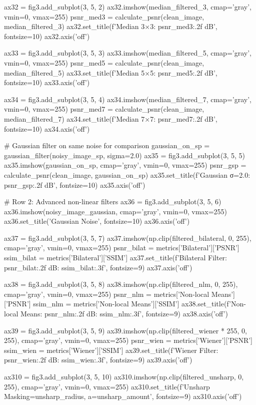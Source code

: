 \documentclass[a4paper, 11pt]{article}
\begin{document}
\begin{pycode}
ax32 = fig3.add_subplot(3, 5, 2)
ax32.imshow(median_filtered_3, cmap='gray', vmin=0, vmax=255)
psnr_med3 = calculate_psnr(clean_image, median_filtered_3)
ax32.set_title(f'Median 3×3\nPSNR: {psnr_med3:.2f} dB', fontsize=10)
ax32.axis('off')

ax33 = fig3.add_subplot(3, 5, 3)
ax33.imshow(median_filtered_5, cmap='gray', vmin=0, vmax=255)
psnr_med5 = calculate_psnr(clean_image, median_filtered_5)
ax33.set_title(f'Median 5×5\nPSNR: {psnr_med5:.2f} dB', fontsize=10)
ax33.axis('off')

ax34 = fig3.add_subplot(3, 5, 4)
ax34.imshow(median_filtered_7, cmap='gray', vmin=0, vmax=255)
psnr_med7 = calculate_psnr(clean_image, median_filtered_7)
ax34.set_title(f'Median 7×7\nPSNR: {psnr_med7:.2f} dB', fontsize=10)
ax34.axis('off')

# Gaussian filter on same noise for comparison
gaussian_on_sp = gaussian_filter(noisy_image_sp, sigma=2.0)
ax35 = fig3.add_subplot(3, 5, 5)
ax35.imshow(gaussian_on_sp, cmap='gray', vmin=0, vmax=255)
psnr_gsp = calculate_psnr(clean_image, gaussian_on_sp)
ax35.set_title(f'Gaussian σ=2.0\nPSNR: {psnr_gsp:.2f} dB', fontsize=10)
ax35.axis('off')

# Row 2: Advanced non-linear filters
ax36 = fig3.add_subplot(3, 5, 6)
ax36.imshow(noisy_image_gaussian, cmap='gray', vmin=0, vmax=255)
ax36.set_title('Gaussian Noise', fontsize=10)
ax36.axis('off')

ax37 = fig3.add_subplot(3, 5, 7)
ax37.imshow(np.clip(filtered_bilateral, 0, 255), cmap='gray', vmin=0, vmax=255)
psnr_bilat = metrics['Bilateral']['PSNR']
ssim_bilat = metrics['Bilateral']['SSIM']
ax37.set_title(f'Bilateral Filter\nPSNR: {psnr_bilat:.2f} dB\nSSIM: {ssim_bilat:.3f}', fontsize=9)
ax37.axis('off')

ax38 = fig3.add_subplot(3, 5, 8)
ax38.imshow(np.clip(filtered_nlm, 0, 255), cmap='gray', vmin=0, vmax=255)
psnr_nlm = metrics['Non-local Means']['PSNR']
ssim_nlm = metrics['Non-local Means']['SSIM']
ax38.set_title(f'Non-local Means\nPSNR: {psnr_nlm:.2f} dB\nSSIM: {ssim_nlm:.3f}', fontsize=9)
ax38.axis('off')

ax39 = fig3.add_subplot(3, 5, 9)
ax39.imshow(np.clip(filtered_wiener * 255, 0, 255), cmap='gray', vmin=0, vmax=255)
psnr_wien = metrics['Wiener']['PSNR']
ssim_wien = metrics['Wiener']['SSIM']
ax39.set_title(f'Wiener Filter\nPSNR: {psnr_wien:.2f} dB\nSSIM: {ssim_wien:.3f}', fontsize=9)
ax39.axis('off')

ax310 = fig3.add_subplot(3, 5, 10)
ax310.imshow(np.clip(filtered_unsharp, 0, 255), cmap='gray', vmin=0, vmax=255)
ax310.set_title(f'Unsharp Masking\nr={unsharp_radius}, a={unsharp_amount}', fontsize=9)
ax310.axis('off')


\end{pycode}
\end{document}

